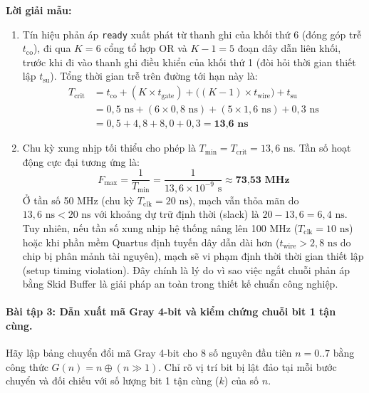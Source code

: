 \textbf{Lời giải mẫu:}
\begin{enumerate}[label=(\alph*)]
    \item Tín hiệu phản áp \texttt{ready} xuất phát từ thanh ghi của khối thứ 6 (đóng góp trễ $t_{\text{co}}$), đi qua $K = 6$ cổng tổ hợp OR và $K-1 = 5$ đoạn dây dẫn liên khối, trước khi đi vào thanh ghi điều khiển của khối thứ 1 (đòi hỏi thời gian thiết lập $t_{\text{su}}$). Tổng thời gian trễ trên đường tới hạn này là:
    \begin{align}
    T_{\text{crit}} &= t_{\text{co}} + (K \times t_{\text{gate}}) + \big((K - 1) \times t_{\text{wire}}\big) + t_{\text{su}} \nonumber \\
                    &= 0{,}5\text{ ns} + (6 \times 0{,}8\text{ ns}) + (5 \times 1{,}6\text{ ns}) + 0{,}3\text{ ns} \nonumber \\
                    &= 0{,}5 + 4{,}8 + 8{,}0 + 0{,}3 = \textbf{13{,}6 ns}
    \end{align}
    \item Chu kỳ xung nhịp tối thiểu cho phép là $T_{\min} = T_{\text{crit}} = 13{,}6\text{ ns}$. Tần số hoạt động cực đại tương ứng là:
    \begin{equation}
    F_{\max} = \frac{1}{T_{\min}} = \frac{1}{13{,}6 \times 10^{-9}\text{ s}} \approx \textbf{73{,}53 MHz}
    \end{equation}
    Ở tần số 50 MHz (chu kỳ $T_{\text{clk}} = 20\text{ ns}$), mạch vẫn thỏa mãn do $13{,}6\text{ ns} < 20\text{ ns}$ với khoảng dự trữ định thời (slack) là $20 - 13{,}6 = 6{,}4\text{ ns}$. Tuy nhiên, nếu tần số xung nhịp hệ thống nâng lên 100 MHz ($T_{\text{clk}} = 10\text{ ns}$) hoặc khi phần mềm Quartus định tuyến dây dẫn dài hơn ($t_{\text{wire}} > 2{,}8\text{ ns}$ do chip bị phân mảnh tài nguyên), mạch sẽ vi phạm định thời thời gian thiết lập (setup timing violation). Đây chính là lý do vì sao việc ngắt chuỗi phản áp bằng Skid Buffer là giải pháp an toàn trong thiết kế chuẩn công nghiệp.
\end{enumerate}

\paragraph{Bài tập 3: Dẫn xuất mã Gray 4-bit và kiểm chứng chuỗi bit 1 tận cùng.}
Hãy lập bảng chuyển đổi mã Gray 4-bit cho 8 số nguyên đầu tiên $n = 0..7$ bằng công thức $G(n) = n \oplus (n \gg 1)$. Chỉ rõ vị trí bit bị lật đảo tại mỗi bước chuyển và đối chiếu với số lượng bit 1 tận cùng ($k$) của số $n$.

